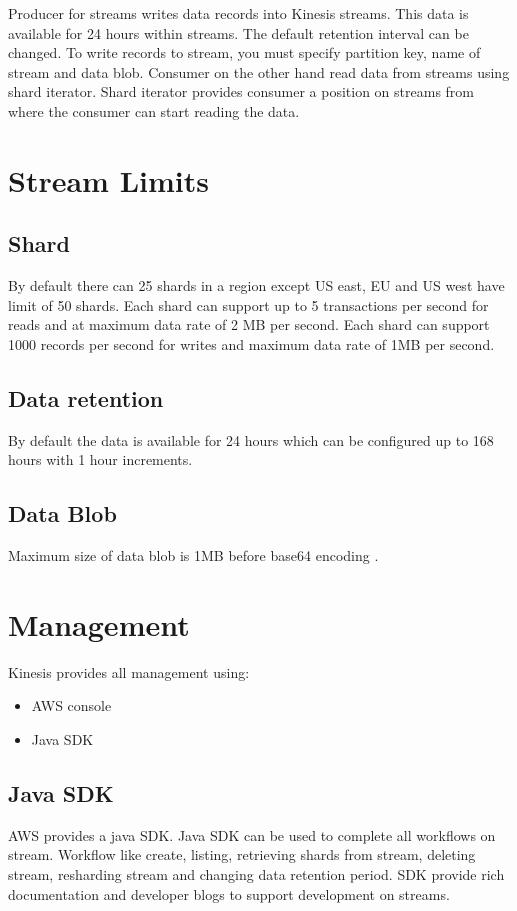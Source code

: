 \documentclass[9pt,twocolumn,twoside]{../../styles/osajnl}
\begin{document}
Producer for streams writes data records into Kinesis streams. This data is
available for 24 hours within streams. The default retention interval can be
changed. To write records to stream, you must specify partition key, name of
stream and data blob. Consumer on the other hand read data from streams using
shard iterator. Shard iterator provides consumer a position on streams from
where the consumer can start reading the data.

\section{Stream Limits}
\subsection{Shard}
By default there can 25 shards in a region except US east, EU and US west have
limit of 50 shards. Each shard can support up to 5 transactions per second for
reads and at maximum data rate of 2 MB per second. Each shard can support 1000
records per second for writes and maximum data rate of 1MB per second.

\subsection{Data retention}
By default the data is available for 24 hours which can be configured up to 168
hours with 1 hour increments.

\subsection{Data Blob}
Maximum size of data blob is 1MB before base64 encoding \CE.

\section{Management}
Kinesis provides all management using:
\begin{itemize}
	\item  AWS console
	\item Java SDK \cite{www-kinesis-javasdk}
\end{itemize}
\subsection{Java SDK}
AWS provides a java SDK. Java SDK \cite{www-kinesis-javasdk} can be used to
complete all workflows on stream. Workflow like create, listing, retrieving
shards from stream, deleting stream, resharding stream and changing data
retention period. SDK provide rich documentation and developer blogs to support
development on streams.
\end{document}
